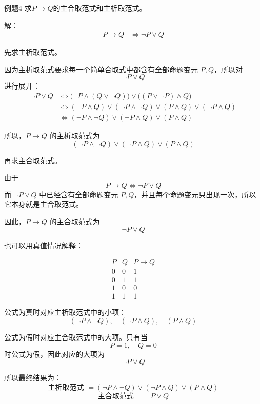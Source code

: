 \begin{question}{例题4}
	求\(P \to Q\)的主合取范式和主析取范式。
	
	解：
	\begin{align*}
		P \to Q
		&\Leftrightarrow \neg P \lor Q
	\end{align*}
	
	先求主析取范式。
	
	因为主析取范式要求每一个简单合取式中都含有全部命题变元 \(P,Q\)，所以对
	\[
	\neg P \lor Q
	\]
	进行展开：
	\begin{align*}
		\neg P \lor Q
		&\Leftrightarrow \big(\neg P \land (Q\lor \neg Q)\big)
		\lor \big((P\lor \neg P)\land Q\big) \\
		&\Leftrightarrow (\neg P\land Q)\lor(\neg P\land \neg Q)
		\lor(P\land Q)\lor(\neg P\land Q) \\
		&\Leftrightarrow (\neg P\land \neg Q)\lor(\neg P\land Q)\lor(P\land Q)
	\end{align*}
	
	所以，\(P \to Q\) 的主析取范式为
	\[
	\boxed{(\neg P\land \neg Q)\lor(\neg P\land Q)\lor(P\land Q)}
	\]
	
	再求主合取范式。
	
	由于
	\[
	P \to Q \Leftrightarrow \neg P \lor Q
	\]
	而 \(\neg P \lor Q\) 中已经含有全部命题变元 \(P,Q\)，并且每个命题变元只出现一次，所以它本身就是主合取范式。
	
	因此，\(P \to Q\) 的主合取范式为
	\[
	\boxed{\neg P \lor Q}
	\]
	
	也可以用真值情况解释：
	
	\[
	\begin{array}{c|c|c}
		P & Q & P\to Q\\
		\hline
		0 & 0 & 1\\
		0 & 1 & 1\\
		1 & 0 & 0\\
		1 & 1 & 1
	\end{array}
	\]
	
	公式为真时对应主析取范式中的小项：
	\[
	(\neg P\land \neg Q),\quad(\neg P\land Q),\quad(P\land Q)
	\]
	
	公式为假时对应主合取范式中的大项。只有当
	\[
	P=1,\quad Q=0
	\]
	时公式为假，因此对应的大项为
	\[
	\neg P\lor Q
	\]
	
	所以最终结果为：
	\[
	\boxed{\text{主析取范式 }=(\neg P\land \neg Q)\lor(\neg P\land Q)\lor(P\land Q)}
	\]
	\[
	\boxed{\text{主合取范式 }=\neg P\lor Q}
	\]
	
\end{question}

